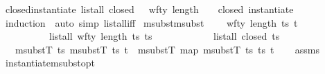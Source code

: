 \begin{isabellebody}
\isanewline
{}\isamarkupfalse%
\ closed{\isacharunderscore}{\kern0pt}instantiate{\isacharcolon}{\kern0pt}\ {\isachardoublequoteopen}list{\isacharunderscore}{\kern0pt}all\ closed\ {\isasymOmega}\ {\isasymLongrightarrow}\ wf{\isacharunderscore}{\kern0pt}ty\ {\isacharparenleft}{\kern0pt}length\ {\isasymOmega}{\isacharparenright}{\kern0pt}\ {\isasymtau}\ {\isasymLongrightarrow}\ closed\ {\isacharparenleft}{\kern0pt}instantiate\ {\isasymOmega}\ {\isasymtau}{\isacharparenright}{\kern0pt}{\isachardoublequoteclose}\isanewline
%
\isadelimproof
\ \ %
\endisadelimproof
%
\isatagproof
{}\isamarkupfalse%
\ {\isacharparenleft}{\kern0pt}induction\ {\isasymtau}{\isacharparenright}{\kern0pt}\ {\isacharparenleft}{\kern0pt}auto\ simp{\isacharcolon}{\kern0pt}\ list{\isacharunderscore}{\kern0pt}all{\isacharunderscore}{\kern0pt}iff{\isacharparenright}{\kern0pt}%
\endisatagproof
{\isafoldproof}%
%
\isadelimproof
\isanewline
%
\endisadelimproof
\isanewline
{}\isamarkupfalse%
\ msubst{\isacharunderscore}{\kern0pt}msubst{\isacharcolon}{\kern0pt}\ \isanewline
\ \ \ {\isachardoublequoteopen}wf{\isacharunderscore}{\kern0pt}ty\ {\isacharparenleft}{\kern0pt}length\ ts{}{\isacharparenright}{\kern0pt}\ t{\isachardoublequoteclose}\ \ \isanewline
\ \ \ \ \ \ \ \ \ \ {\isachardoublequoteopen}list{\isacharunderscore}{\kern0pt}all\ {\isacharparenleft}{\kern0pt}wf{\isacharunderscore}{\kern0pt}ty\ {\isacharparenleft}{\kern0pt}length\ ts{}{\isacharparenright}{\kern0pt}{\isacharparenright}{\kern0pt}\ ts{}{\isachardoublequoteclose}\ \ \isanewline
\ \ \ \ \ \ \ \ \ \ {\isachardoublequoteopen}list{\isacharunderscore}{\kern0pt}all\ closed\ ts{}{\isachardoublequoteclose}\isanewline
\ \ \ {\isachardoublequoteopen}msubstT\ ts{}\ {\isacharparenleft}{\kern0pt}msubstT\ ts{}\ t{\isacharparenright}{\kern0pt}\ {\isacharequal}{\kern0pt}\ msubstT\ {\isacharparenleft}{\kern0pt}map\ {\isacharparenleft}{\kern0pt}msubstT\ ts{}{\isacharparenright}{\kern0pt}\ ts{}{\isacharparenright}{\kern0pt}\ t{\isachardoublequoteclose}\isanewline
%
\isadelimproof
\ \ %
\endisadelimproof
%
\isatagproof
{}\isamarkupfalse%
\ assms\isanewline
\ \ \isamarkupfalse%
%
\endisatagproof
{\isafoldproof}%
%
\isadelimproof
\isanewline
%
\endisadelimproof
\isanewline
{}\isamarkupfalse%
\ instantiate{\isacharunderscore}{\kern0pt}msubst{\isacharunderscore}{\kern0pt}opt{\isacharcolon}{\kern0pt}\isanewline

\end{isabellebody}

